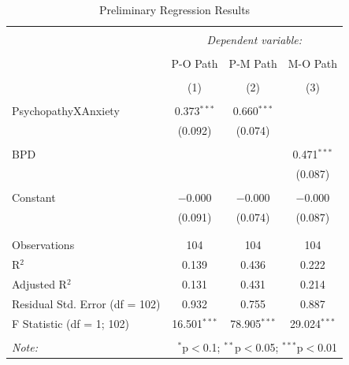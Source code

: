 \documentclass[
  man,floatsintext]{apa7}
\begin{document}
\begin{table}[!htbp] \centering 
  \caption{Preliminary Regression Results} 
  \label{tab:prelim-regression-output} 
\begin{tabular}{@{\extracolsep{1pt}}lccc} 
\\[-1.8ex]\hline 
\hline \\[-1.8ex] 
 & \multicolumn{3}{c}{\textit{Dependent variable:}} \\ 
\cline{2-4} 
\\[-1.8ex] & P-O Path & P-M Path & M-O Path \\ 
\\[-1.8ex] & (1) & (2) & (3)\\ 
\hline \\[-1.8ex] 
 PsychopathyXAnxiety & 0.373$^{***}$ & 0.660$^{***}$ &  \\ 
  & (0.092) & (0.074) &  \\ 
  & & & \\ 
 BPD &  &  & 0.471$^{***}$ \\ 
  &  &  & (0.087) \\ 
  & & & \\ 
 Constant & $-$0.000 & $-$0.000 & $-$0.000 \\ 
  & (0.091) & (0.074) & (0.087) \\ 
  & & & \\ 
\hline \\[-1.8ex] 
Observations & 104 & 104 & 104 \\ 
R$^{2}$ & 0.139 & 0.436 & 0.222 \\ 
Adjusted R$^{2}$ & 0.131 & 0.431 & 0.214 \\ 
Residual Std. Error (df = 102) & 0.932 & 0.755 & 0.887 \\ 
F Statistic (df = 1; 102) & 16.501$^{***}$ & 78.905$^{***}$ & 29.024$^{***}$ \\ 
\hline 
\hline \\[-1.8ex] 
\textit{Note:}  & \multicolumn{3}{r}{$^{*}$p$<$0.1; $^{**}$p$<$0.05; $^{***}$p$<$0.01} \\ 
\end{tabular} 
\end{table}
\end{document}
